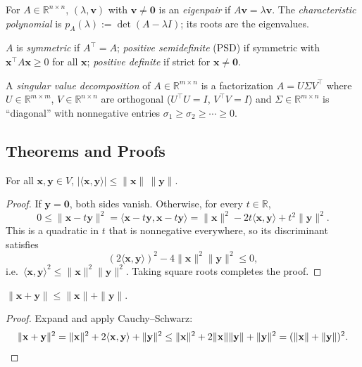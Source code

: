 \begin{definition}
For $A\in\mathbb{R}^{n\times n}$, $(\lambda,\mathbf{v})$ with $\mathbf{v}\ne\mathbf{0}$ is an \emph{eigenpair} if $A\mathbf{v}=\lambda\mathbf{v}$. The \emph{characteristic polynomial} is $p_A(\lambda):=\det(A-\lambda I)$; its roots are the eigenvalues.
\end{definition}

\begin{definition}
$A$ is \emph{symmetric} if $A^\top=A$; \emph{positive semidefinite} (PSD) if symmetric with $\mathbf{x}^\top A\mathbf{x}\ge 0$ for all $\mathbf{x}$; \emph{positive definite} if strict for $\mathbf{x}\ne\mathbf{0}$.
\end{definition}

\begin{definition}
A \emph{singular value decomposition} of $A\in\mathbb{R}^{m\times n}$ is a factorization $A=U\Sigma V^\top$ where $U\in\mathbb{R}^{m\times m}$, $V\in\mathbb{R}^{n\times n}$ are orthogonal ($U^\top U=I$, $V^\top V=I$) and $\Sigma\in\mathbb{R}^{m\times n}$ is ``diagonal'' with nonnegative entries $\sigma_1\ge\sigma_2\ge\cdots\ge 0$.
\end{definition}

\subsection*{Theorems and Proofs}

\begin{theorem}
For all $\mathbf{x},\mathbf{y}\in V$, $|\langle\mathbf{x},\mathbf{y}\rangle|\le\|\mathbf{x}\|\,\|\mathbf{y}\|$.
\end{theorem}
\begin{proof}
If $\mathbf{y}=\mathbf{0}$, both sides vanish. Otherwise, for every $t\in\mathbb{R}$,
\[
0\le\|\mathbf{x}-t\mathbf{y}\|^2=\langle\mathbf{x}-t\mathbf{y},\mathbf{x}-t\mathbf{y}\rangle=\|\mathbf{x}\|^2-2t\langle\mathbf{x},\mathbf{y}\rangle+t^2\|\mathbf{y}\|^2.
\]
This is a quadratic in $t$ that is nonnegative everywhere, so its discriminant satisfies
\[
(2\langle\mathbf{x},\mathbf{y}\rangle)^2-4\|\mathbf{x}\|^2\|\mathbf{y}\|^2\le 0,
\]
i.e.\ $\langle\mathbf{x},\mathbf{y}\rangle^2\le\|\mathbf{x}\|^2\|\mathbf{y}\|^2$. Taking square roots completes the proof.
\end{proof}

\begin{corollary}
$\|\mathbf{x}+\mathbf{y}\|\le\|\mathbf{x}\|+\|\mathbf{y}\|$.
\end{corollary}
\begin{proof}
Expand and apply Cauchy--Schwarz:
\[
\|\mathbf{x}+\mathbf{y}\|^2=\|\mathbf{x}\|^2+2\langle\mathbf{x},\mathbf{y}\rangle+\|\mathbf{y}\|^2\le\|\mathbf{x}\|^2+2\|\mathbf{x}\|\|\mathbf{y}\|+\|\mathbf{y}\|^2=(\|\mathbf{x}\|+\|\mathbf{y}\|)^2.\qedhere
\]
\end{proof}

